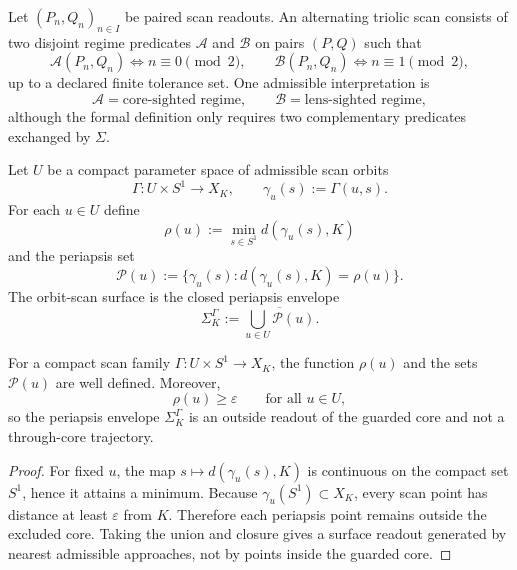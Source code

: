 \begin{definition}
\label{def:alternating-triolic-scan-strict}
Let $(P_n,Q_n)_{n\in I}$ be paired scan readouts.  An alternating triolic scan consists of two disjoint regime predicates $\mathcal A$ and $\mathcal B$ on pairs $(P,Q)$ such that
\[
\mathcal A(P_n,Q_n)\Longleftrightarrow n\equiv0\pmod2,
\qquad
\mathcal B(P_n,Q_n)\Longleftrightarrow n\equiv1\pmod2,
\]
up to a declared finite tolerance set.  One admissible interpretation is
\[
\mathcal A=\text{core-sighted regime},
\qquad
\mathcal B=\text{lens-sighted regime},
\]
although the formal definition only requires two complementary predicates exchanged by $\Sigma$.
\end{definition}

\begin{definition}
\label{def:periapsis-envelope-strict}
Let $U$ be a compact parameter space of admissible scan orbits
\[
\Gamma:U\times S^1\longrightarrow X_K,
\qquad
\gamma_u(s):=\Gamma(u,s).
\]
For each $u\in U$ define
\[
\rho(u):=\min_{s\in S^1} d(\gamma_u(s),K)
\]
and the periapsis set
\[
\mathcal P(u):=
\{\gamma_u(s):d(\gamma_u(s),K)=\rho(u)\}.
\]
The orbit-scan surface is the closed periapsis envelope
\[
\Sigma_K^\Gamma
:=
\overline{\bigcup_{u\in U}\mathcal P(u)}.
\]
\end{definition}

\begin{proposition}
\label{prop:existence-guardedness-scan-surface}
For a compact scan family $\Gamma:U\times S^1\to X_K$, the function $\rho(u)$ and the sets $\mathcal P(u)$ are well defined.  Moreover,
\[
\rho(u)\geq\varepsilon
\qquad\text{for all }u\in U,
\]
so the periapsis envelope $\Sigma_K^\Gamma$ is an outside readout of the guarded core and not a through-core trajectory.
\end{proposition}

\begin{proof}
For fixed $u$, the map $s\mapsto d(\gamma_u(s),K)$ is continuous on the compact set $S^1$, hence it attains a minimum.  Because $\gamma_u(S^1)\subset X_K$, every scan point has distance at least $\varepsilon$ from $K$.  Therefore each periapsis point remains outside the excluded core.  Taking the union and closure gives a surface readout generated by nearest admissible approaches, not by points inside the guarded core.
\end{proof}

